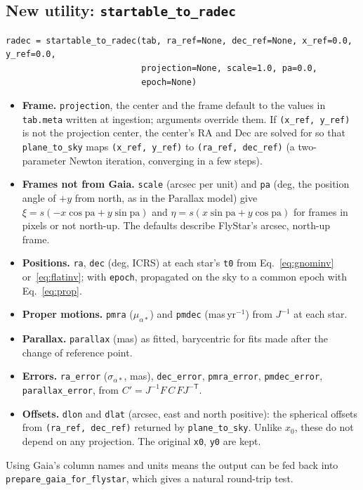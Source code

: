 \documentclass[11pt]{article}
\newcommand{\code}[1]{\texttt{#1}}
\begin{document}
\subsection{New utility: \code{startable\_to\_radec}}

\begin{verbatim}
radec = startable_to_radec(tab, ra_ref=None, dec_ref=None, x_ref=0.0, y_ref=0.0,
                           projection=None, scale=1.0, pa=0.0,
                           epoch=None)
\end{verbatim}
\begin{itemize}
  \item \textbf{Frame.} \code{projection}, the center and the frame default to
    the values in \code{tab.meta} written at ingestion; arguments override
    them. If \code{(x\_ref, y\_ref)} is not the projection center, the
    center's RA and Dec are solved for so that \code{plane\_to\_sky} maps
    \code{(x\_ref, y\_ref)} to \code{(ra\_ref, dec\_ref)} (a two-parameter
    Newton iteration, converging in a few steps).
  \item \textbf{Frames not from Gaia.} \code{scale} (arcsec per unit) and
    \code{pa} (deg, the position angle of $+y$ from north, as in the Parallax
    model) give $\xi = s(-x\cos\mathrm{pa} + y\sin\mathrm{pa})$ and
    $\eta = s(x\sin\mathrm{pa} + y\cos\mathrm{pa})$ for frames in pixels or not
    north-up. The defaults describe FlyStar's arcsec, north-up frame.
  \item \textbf{Positions.} \code{ra}, \code{dec} (deg, ICRS) at each star's
    \code{t0} from Eq.~\eqref{eq:gnominv} or~\eqref{eq:flatinv}; with
    \code{epoch}, propagated on the sky to a common epoch with
    Eq.~\eqref{eq:prop}.
  \item \textbf{Proper motions.} \code{pmra} ($\mu_{\alpha*}$) and
    \code{pmdec} (mas\,yr$^{-1}$) from $J^{-1}$ at each star.
  \item \textbf{Parallax.} \code{parallax} (mas) as fitted, barycentric
    for fits made after the change of reference point.
  \item \textbf{Errors.} \code{ra\_error} ($\sigma_{\alpha*}$, mas),
    \code{dec\_error}, \code{pmra\_error}, \code{pmdec\_error},
    \code{parallax\_error}, from $C' = J^{-1}F\,C\,F J^{-\mathsf T}$.
  \item \textbf{Offsets.} \code{dlon} and \code{dlat} (arcsec, east and
    north positive): the spherical offsets from \code{(ra\_ref, dec\_ref)}
    returned by \code{plane\_to\_sky}. Unlike $x_0$, these do not depend on
    any projection. The original \code{x0}, \code{y0} are kept.
\end{itemize}
Using Gaia's column names and units means the output can be fed back into
\code{prepare\_gaia\_for\_flystar}, which gives a natural round-trip test.
\end{document}
